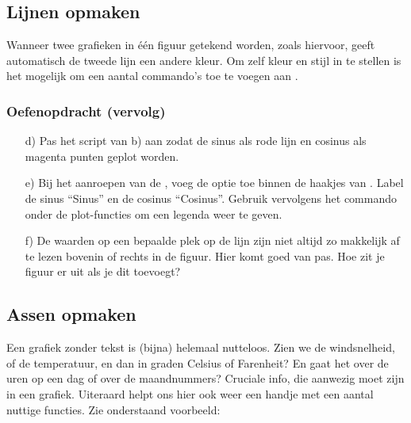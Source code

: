 \documentclass[a4paper,11pt, fleqn]{article}
\begin{document}
\subsection{Lijnen opmaken}
Wanneer twee grafieken in \'e\'en figuur getekend worden, zoals hiervoor, geeft  automatisch de tweede lijn een andere kleur. Om zelf kleur en stijl in te stellen is het mogelijk om een aantal commando's toe te voegen aan .


\subsubsection*{Oefenopdracht (vervolg)}
\begin{itemize}
	\item[d)] Pas het script van b) aan zodat de sinus als rode lijn en cosinus als magenta punten geplot worden.

	\item[e)] Bij het aanroepen van de , voeg de optie  toe binnen de haakjes van . Label de sinus ``Sinus'' en de cosinus ``Cosinus''. Gebruik vervolgens het commando  onder de plot-functies om een legenda weer te geven.
	
	\item[f)] De waarden op een bepaalde plek op de lijn zijn niet altijd zo makkelijk af te lezen bovenin of rechts in de figuur. Hier komt  goed van pas. Hoe zit je figuur er uit als je dit toevoegt?
\end{itemize}

\subsection{Assen opmaken}
Een grafiek zonder tekst is (bijna) helemaal nutteloos. Zien we de windsnelheid, of de temperatuur, en dan in graden Celsius of Farenheit? En gaat het over de uren op een dag of over de maandnummers? Cruciale info, die aanwezig moet zijn in een grafiek. Uiteraard helpt  ons hier ook weer een handje met een aantal nuttige functies. Zie onderstaand voorbeeld:

\end{document}
